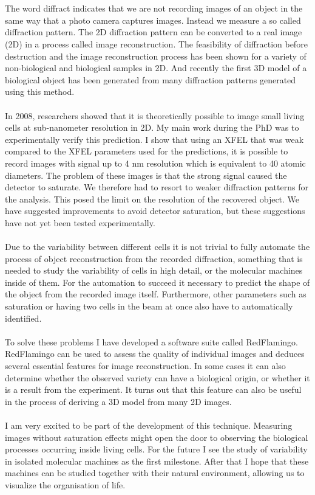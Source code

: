 \\\\
The word diffract indicates that we are not recording images of an object in the same way that a photo camera captures images. Instead we measure a so called diffraction pattern. The 2D diffraction pattern can be converted to a real image (2D) in a process called image reconstruction. The feasibility of diffraction before destruction and the image reconstruction process has been shown for a variety of non-biological and biological samples in 2D.  And recently the first 3D model of a biological object has been generated from many diffraction patterns generated using this method.
\\\\
In 2008, researchers showed that it is theoretically possible to image small living cells at sub-nanometer resolution in 2D. My main work during the PhD was to experimentally verify this prediction. I show that using an XFEL that was weak compared to the XFEL parameters used for the predictions, it is possible to record images with signal up to 4 nm resolution which is equivalent to 40 atomic diameters. The problem of these images is that the strong signal caused the detector to saturate. We therefore had to resort to weaker diffraction patterns for the analysis. This posed the limit on the resolution of the recovered object. We have suggested improvements to avoid detector saturation, but these suggestions have not yet been tested experimentally.
\\\\
Due to the variability between different cells it is not trivial to fully automate the process of object reconstruction from the recorded diffraction, something that is needed to study the variability of cells in high detail, or the molecular machines inside of them. For the automation to succeed it necessary to predict the shape of the object from the recorded image itself. Furthermore, other parameters such as saturation or having two cells in the beam at once also have to automatically identified.
\\\\
To solve these problems I have developed a software suite called RedFlamingo. RedFlamingo can be used to assess the quality of individual images and deduces several essential features for image reconstruction. In some cases it can also determine whether the observed variety can have a biological origin, or whether it is a result from the experiment. It turns out that this feature can also be useful in the process of deriving a 3D model from many 2D images. 
\\\\
I am very excited to be part of the development of this technique. Measuring images without saturation effects might open the door to observing the biological processes occurring inside living cells. For the future I see the study of variability in isolated molecular machines as the first milestone. After that I hope that these machines can be studied together with their natural environment, allowing us to visualize the organisation of life.
